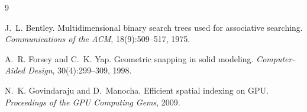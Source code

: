 \documentclass{article}
\begin{document}

\begin{thebibliography}{9}

J.~L. Bentley.
\newblock Multidimensional binary search trees used for associative searching.
\newblock \emph{Communications of the ACM}, 18(9):509--517, 1975.

A.~R. Forsey and C.~K. Yap.
\newblock Geometric snapping in solid modeling.
\newblock \emph{Computer-Aided Design}, 30(4):299--309, 1998.

N.~K. Govindaraju and D.~Manocha.
\newblock Efficient spatial indexing on GPU.
\newblock \emph{Proceedings of the GPU Computing Gems}, 2009.

\end{thebibliography}
\end{document}
